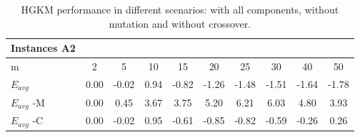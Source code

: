 \begin{table}[H]
\centering
\begin{tabular}{@{}lccccccccc@{}}
\toprule
Instances A2 &      &       &      &       &       &       &       &       &       \\ \midrule
m            & 2    & 5     & 10   & 15    & 20    & 25    & 30    & 40    & 50    \\
$E_{avg}$    & 0.00 & -0.02 & 0.94 & -0.82 & -1.26 & -1.48 & -1.51 & -1.64 & -1.78 \\
$E_{avg}$ -M   & 0.00 & 0.45  & 3.67 & 3.75  & 5.20  & 6.21  & 6.03  & 4.80  & 3.93  \\
$E_{avg}$ -C   & 0.00 & -0.02 & 0.95 & -0.61 & -0.85 & -0.82 & -0.59 & -0.26 & 0.26  \\ \bottomrule
\end{tabular}
\caption{HGKM performance in different scenarios: with all components, without mutation and without crossover.}
\label{components}
\end{table}